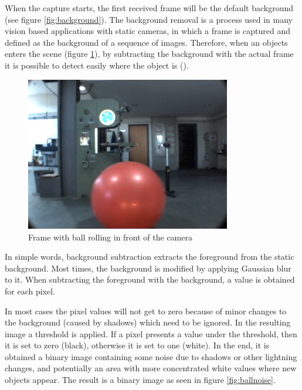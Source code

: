When the capture starts, the first received frame will be the default background (see figure \ref{fig:background}). The background removal is a process used in many vision based applications with static cameras, in which a frame is captured and defined as the background of a sequence of images. Therefore, when an objects enters the scene (figure \ref{fig:balltest}), by subtracting the background with the actual frame it is possible to detect easily where the object is (\cite{OpenCV}).

\begin{figure}[htp]
	
	\centering
	\includegraphics[width=0.8\textwidth]{capcalib/imgs/ball_test.png}
	
	\caption{Frame with ball rolling in front of the camera}
	\label{fig:balltest}
	
\end{figure}

In simple words, background subtraction extracts the foreground from the static background. Most times, the background is modified by applying Gaussian blur to it. When subtracting the foreground with the background, a value is obtained for each pixel.

In most cases the pixel values will not get to zero because of minor changes to the background (caused by shadows) which need to be ignored. In the resulting image a threshold is applied. If a pixel presents a value under the threshold, then it is set to zero (black), otherwise it is set to one (white). In the end, it is obtained a binary image containing some noise due to shadows or other lightning changes, and potentially an area with more concentrated white values where new objects appear. The result is a binary image as seen in figure \ref{fig:ballnoise}.


